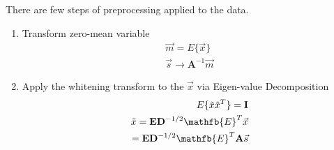 \documentclass[]{article}
\begin{document}
There are few steps of preprocessing applied to the data.  
\begin{enumerate}
	\item Transform zero-mean variable 
	\begin{eqnarray}
		\vec{m} = E \{ \vec{x}\} \\
		\vec{s} \to \mathbf{A}^{-1}\vec{m}
	\end{eqnarray}
	\item Apply the whitening transform to the $\vec{x}$ via Eigen-value Decomposition
	\begin{eqnarray}
	E\{ \tilde{x}\tilde{x}^T \} = \mathbf{I} \\
	\tilde{x} = \mathbf{E}\mathbf{D}^{-1/2}\mathfb{E}^T \vec{x} \\
	= \mathbf{E}\mathbf{D}^{-1/2}\mathfb{E}^T \mathbf{A}\vec{s} \\
	\end{eqnarray}
	
\end{enumerate}






\end{document}
